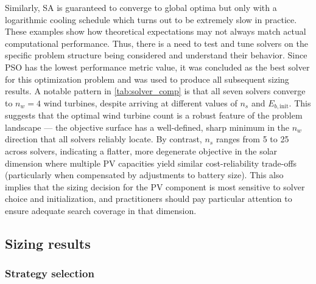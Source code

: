 \documentclass[final,3p,times]{elsarticle}
\begin{document}
Similarly, SA is guaranteed to converge to global optima but only with a logarithmic cooling schedule which turns out to be extremely slow in practice.  These examples show how theoretical expectations may not always match actual computational performance. Thus, there is a need to test and tune solvers on the specific problem structure being considered and understand their behavior. Since PSO has the lowest performance metric value, it was concluded as the best solver for this optimization problem and was used to produce all subsequent sizing results. A notable pattern in \cref{tab:solver_comp} is that all seven solvers converge to $n_w = 4$ wind turbines, despite arriving at different values of $n_s$ and $E_{b,\text{init}}$. This suggests that the optimal wind turbine count is a robust feature of the problem landscape --- the objective surface has a well-defined, sharp minimum in the $n_w$ direction that all solvers reliably locate. By contrast, $n_s$ ranges from 5 to 25 across solvers, indicating a flatter, more degenerate objective in the solar dimension where multiple PV capacities yield similar cost-reliability trade-offs (particularly when compensated by adjustments to battery size). This also implies that the sizing decision for the PV component is most sensitive to solver choice and initialization, and practitioners should pay particular attention to ensure adequate search coverage in that dimension.

\subsection{Sizing results}

\subsubsection{\label{sec:strat} Strategy selection}
\end{document}

